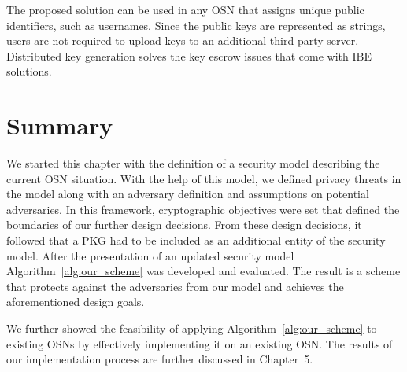 The proposed solution can be used in any OSN that assigns unique public identifiers, such as usernames. Since the public keys are represented as strings, users are not required to upload keys to an additional third party server. Distributed key generation solves the key escrow issues that come with IBE solutions.

\section{Summary}
We started this chapter with the definition of a security model describing the current OSN situation. With the help of this model, we defined privacy threats in the model along with an adversary definition and assumptions on potential adversaries. In this framework, cryptographic objectives were set that defined the boundaries of our further design decisions. From these design decisions, it followed that a PKG had to be included as an additional entity of the security model. After the presentation of an updated security model Algorithm~\ref{alg:our_scheme} was developed and evaluated. The result is a scheme that protects against the adversaries from our model and achieves the aforementioned design goals.

We further showed the feasibility of applying Algorithm~\ref{alg:our_scheme} to existing OSNs by effectively implementing it on an existing OSN. The results of our implementation process are further discussed in Chapter~5.

\newpage

\thispagestyle{empty}

\makeatletter
\setlength{\headsep}{-10pt}
\makeatother

